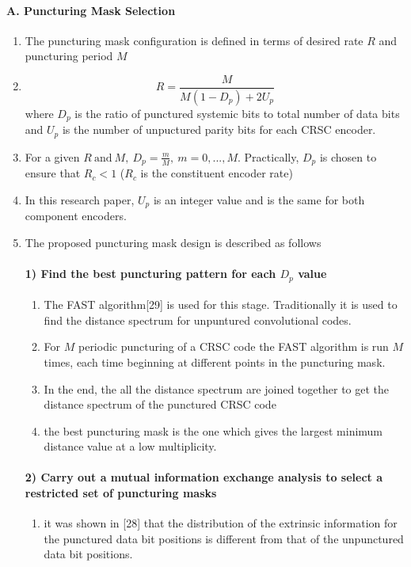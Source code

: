 \documentclass[fontsize=12pt]{article}
\begin{document}
\paragraph{A. Puncturing Mask Selection}
\begin{enumerate}
\item The puncturing mask configuration is defined in terms of desired rate $R$ and puncturing period $M$ 

\item $$R=\frac{M}{M(1-D_p) + 2U_p}$$ where $D_p$ is the ratio of punctured systemic bits to total number of data bits and $U_p$ is the number of unpuctured parity bits for each CRSC encoder.

\item For a given $R~\text{and}~M,~D_p =\frac{m}{M},~m=0,...,M$. Practically, $D_p$ is chosen to ensure that $R_c<1$ ($R_c$ is the constituent encoder rate)

\item In this research paper, $U_p$ is an integer value and is the same for both component encoders.

\item The proposed puncturing mask design is described as follows
\paragraph{1) Find the best puncturing pattern for each $D_p$ value}
\begin{enumerate}
\item The FAST algorithm[29] is used for this stage. Traditionally it is used to find the distance spectrum for unpuntured convolutional codes.

\item For $M$ periodic puncturing of a CRSC code the FAST algorithm is run $M$ times, each time beginning at different points in the puncturing mask.

\item In the end, the all the distance spectrum are joined together to get the distance spectrum of the punctured CRSC code

\item the best puncturing mask is the one which gives the largest minimum distance value at a low multiplicity.
\end{enumerate}
\paragraph{2) Carry out a mutual information exchange analysis
to select a restricted set of puncturing masks}
\begin{enumerate}
\item it was shown in [28] that the distribution of the extrinsic information for the punctured data bit positions is different from that of the unpunctured data bit positions.


\end{enumerate}
\end{enumerate}
\end{document}
